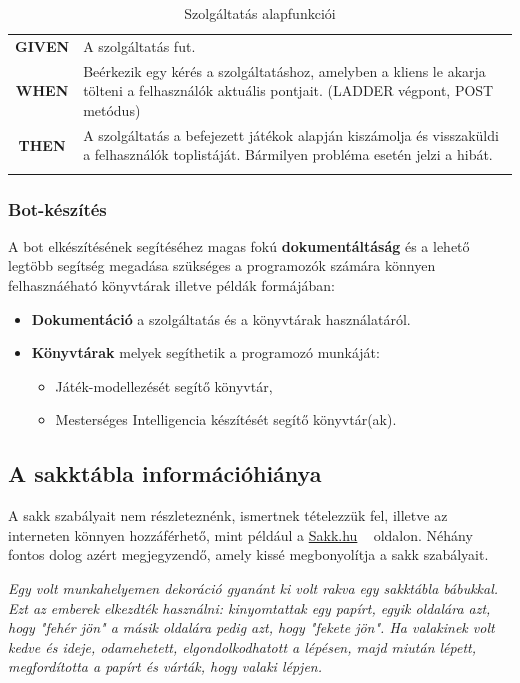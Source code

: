 \documentclass[twoside, a4paper, 12pt]{article}
\begin{document}
\begin{longtable}[c]{|c|p{14cm}|}
	\textbf{GIVEN} &
	A szolgáltatás fut.
	\\ \nobreakhline
	
	\textbf{WHEN} &
	Beérkezik egy kérés a szolgáltatáshoz, amelyben a kliens le akarja tölteni a felhasználók aktuális pontjait. (LADDER végpont, POST metódus)
	\\
	\nobreakhline
	
	\textbf{THEN} &
	A szolgáltatás a befejezett játékok alapján kiszámolja és visszaküldi a felhasználók toplistáját.
	Bármilyen probléma esetén jelzi a hibát.
	\\
	\hline
	
	\caption{Szolgáltatás alapfunkciói}
	\label{userStories:server:api}\\
\end{longtable} 

\subsubsection{Bot-készítés}
A bot elkészítésének segítéséhez magas fokú \textbf{dokumentáltáság} és a lehető legtöbb segítség megadása szükséges a programozók számára könnyen felhasznáéható könyvtárak illetve példák formájában:
\begin{itemize}
	\item \textbf{Dokumentáció} a szolgáltatás és a könyvtárak használatáról.
	\item \textbf{Könyvtárak} melyek segíthetik a programozó munkáját:
	\begin{itemize}
		\item Játék-modellezését segítő könyvtár,
		\item Mesterséges Intelligencia készítését segítő könyvtár(ak).
	\end{itemize}
\end{itemize}

\subsection{A sakktábla információhiánya}\label{A Sakktábla információhiánya}
A sakk szabályait nem részleteznénk, ismertnek tételezzük fel, illetve az interneten könnyen hozzáférhető, mint például a \href{http://www.sakk.hu/help/sakk_szabalyok.html}{Sakk.hu} ~\cite{chessrulessakkhu} oldalon. Néhány fontos dolog azért megjegyzendő, amely kissé megbonyolítja a sakk szabályait.

\textit{Egy volt munkahelyemen dekoráció gyanánt ki volt rakva egy sakktábla bábukkal. Ezt az emberek elkezdték használni: kinyomtattak egy papírt, egyik oldalára azt, hogy "fehér jön" a másik oldalára pedig azt, hogy "fekete jön". Ha valakinek volt kedve és ideje, odamehetett, elgondolkodhatott a lépésen, majd miután lépett, megfordította a papírt és várták, hogy valaki lépjen.}
\end{document}
